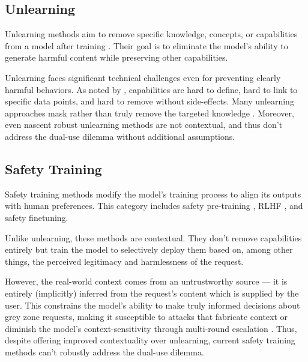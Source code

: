 \documentclass{article}
\theoremstyle{plain}
\theoremstyle{definition}
\theoremstyle{remark}
\begin{document}
\subsection{Unlearning}

Unlearning methods aim to remove specific knowledge, concepts, or
capabilities from a model after training
\cite{liu2024rethinkingmachineunlearninglarge}. Their goal is to
eliminate the model's ability to generate harmful content while
preserving other capabilities.

Unlearning faces significant technical challenges even for preventing
clearly harmful behaviors. As noted by
\citet{barez2025openproblemsmachineunlearning}, capabilities are hard
to define, hard to link to specific data points, and hard to remove
without side-effects. Many unlearning approaches mask rather than
truly remove the targeted knowledge
\cite{deeb2025unlearningmethodsremoveinformation}. Moreover, even
nascent robust unlearning methods
\cite{cloud2024gradientroutingmaskinggradients} are not contextual,
and thus don't address the dual-use dilemma without additional assumptions.

\subsection{Safety Training}

Safety training methods modify the model's training process to align
its outputs with human preferences. This category includes safety
pre-training \cite{maini2025safetypretraininggenerationsafe}, RLHF
\cite{christiano2023deepreinforcementlearninghuman}, and safety finetuning.

Unlike unlearning, these methods are contextual. They don't remove
capabilities entirely but train the model to selectively deploy them
based on, among other things, the perceived legitimacy and
harmlessness of the request.

However, the real-world context comes from an untrustworthy source
--- it is entirely (implicitly) inferred from the request's content
which is supplied by the user. This constrains the model's ability to
make truly informed decisions about grey zone requests, making it
susceptible to attacks that fabricate context
\cite{zeng2024johnnypersuadellmsjailbreak} or diminish the model's
context-sensitivity through multi-round escalation
\cite{russinovich2025greatwritearticlethat}.
Thus, despite offering improved contextuality over unlearning,
current safety training methods can't robustly address the dual-use dilemma.
\end{document}

